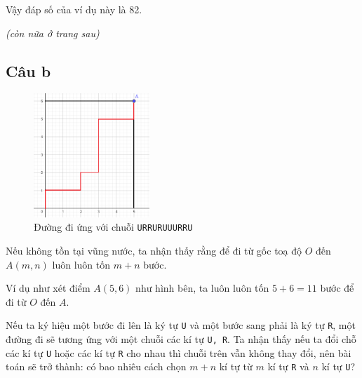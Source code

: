 \documentclass[12pt]{article}
\newcommand{\cd}[1]{\texttt{#1}}
\begin{document}
\begin{figure}[H]
    \newcommand{\0}{\textcolor{red}{0}}
    \centering
\end{figure}

Vậy đáp số của ví dụ này là 82. \bigskip 

\textit{(còn nữa ở trang sau)}
\pagebreak

\subsection{Câu b}
\begin{figure}
    \includegraphics[width=0.39\textwidth]{image/Bai8b.png}
    \caption*{Đường đi ứng với chuỗi \cd{URRURUUURRU}}
    \vspace*{-2cm}
\end{figure}
Nếu không tồn tại vũng nước, ta nhận thấy rằng để đi từ gốc toạ độ $O$ đến $A(m, n)$ luôn luôn tốn $m+n$ bước. \par Ví dụ như xét điểm $A(5, 6)$ như hình bên, ta luôn luôn tốn $5+6=11$ bước để đi từ $O$ đến $A$.\par 
Nếu ta ký hiệu một bước đi lên là ký tự \cd U và một bước sang phải là ký tự \cd R, một đường đi sẽ tương ứng với một chuỗi các kí tự \cd{U, R}. Ta nhận thấy nếu ta đổi chỗ các kí tự \cd U hoặc các kí tự \cd R cho nhau thì chuỗi trên vẫn không thay đổi, nên bài toán sẽ trở thành: có bao nhiêu cách chọn $m+n$ kí tự từ $m$ kí tự \cd R và $n$ kí tự \cd U? \bigskip
\end{document}
